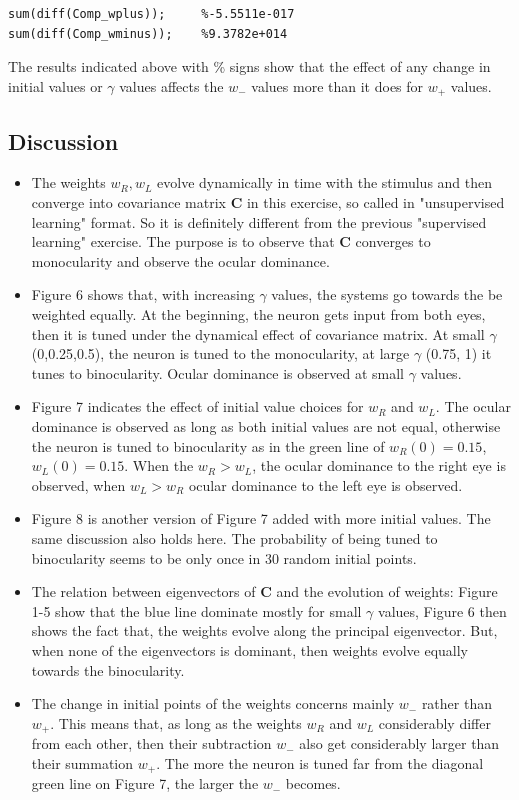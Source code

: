 \documentclass{article}
\begin{document}
	\begin{verbatim}
sum(diff(Comp_wplus));     %-5.5511e-017
sum(diff(Comp_wminus));    %9.3782e+014
	\end{verbatim}
The results indicated above with \% signs show that the effect of any change in initial values or $\gamma$ values affects the $w_-$ values more than it does for $w_+$ values. 

\subsection{Discussion}

\begin{itemize}
\item The weights $w_R,w_L$ evolve dynamically in time with the stimulus and then converge into covariance matrix \textbf{C} in this exercise, so called in "unsupervised learning" format. So it is definitely different from the previous "supervised learning" exercise. The purpose is to observe that \textbf{C} converges to monocularity and observe the ocular dominance.

 \item Figure 6 shows that, with increasing $\gamma$ values, the systems go towards the be weighted equally. At the beginning, the neuron gets input from both eyes, then it is tuned under the dynamical effect of covariance matrix. At small $\gamma$ (0,0.25,0.5), the neuron is tuned to the monocularity, at large $\gamma$ (0.75, 1) it tunes to binocularity. Ocular dominance is observed at small $\gamma$ values.

\item Figure 7 indicates the effect of initial value choices for $w_R$ and $w_L$. The ocular dominance is observed as long as both initial values are not equal, otherwise the neuron is tuned to binocularity as in the green line of $w_R(0)=0.15$, $w_L(0)=0.15$. When the $w_R>w_L$, the ocular dominance to the right eye is observed, when $w_L>w_R$ ocular dominance to the left eye is observed.  

\item Figure 8 is another version of Figure 7 added with more initial values. The same discussion also holds here. The probability of being tuned to binocularity seems to be only once in 30 random initial points. 

\item The relation between eigenvectors of \textbf{C} and the evolution of weights: Figure 1-5 show that the blue line dominate mostly for small $\gamma$ values, Figure 6 then shows the fact that, the weights evolve along the principal eigenvector. But, when none of the eigenvectors is dominant, then weights evolve equally towards the binocularity.

\item The change in initial points of the weights concerns mainly $w_-$ rather than $w_+$. This means that, as long as the weights $w_R$ and $w_L$ considerably differ from each other, then their subtraction $w_-$ also get considerably larger than their summation $w_+$. The more the neuron is tuned far from the diagonal green line on Figure 7, the larger the $w_-$ becomes. 

\end{itemize}
\end{document}
